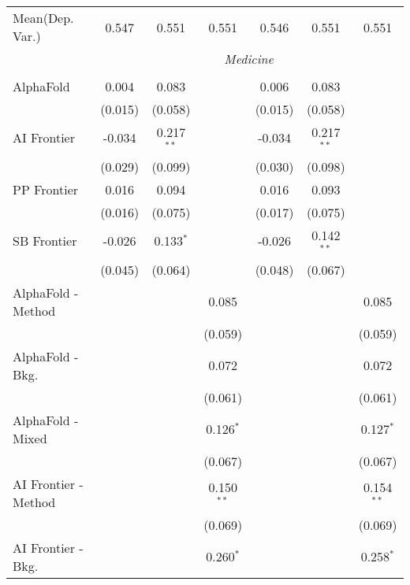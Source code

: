 \begin{tabular}{lcccccc}
Mean(Dep. Var.) & 0.547 & 0.551 & 0.551 & 0.546 & 0.551 & 0.551 \\
 & \multicolumn{6}{c}{\textit{Medicine}} \\ \\
   AlphaFold            & 0.004   & 0.083        &              & 0.006   & 0.083        &   \\   
                        & (0.015) & (0.058)      &              & (0.015) & (0.058)      &   \\   
   AI Frontier          & -0.034  & 0.217$^{**}$ &              & -0.034  & 0.217$^{**}$ &   \\   
                        & (0.029) & (0.099)      &              & (0.030) & (0.098)      &   \\   
   PP Frontier          & 0.016   & 0.094        &              & 0.016   & 0.093        &   \\   
                        & (0.016) & (0.075)      &              & (0.017) & (0.075)      &   \\   
   SB Frontier          & -0.026  & 0.133$^{*}$  &              & -0.026  & 0.142$^{**}$ &   \\   
                        & (0.045) & (0.064)      &              & (0.048) & (0.067)      &   \\   
   AlphaFold - Method   &         &              & 0.085        &         &              & 0.085\\   
                        &         &              & (0.059)      &         &              & (0.059)\\   
   AlphaFold - Bkg.     &         &              & 0.072        &         &              & 0.072\\   
                        &         &              & (0.061)      &         &              & (0.061)\\   
   AlphaFold - Mixed    &         &              & 0.126$^{*}$  &         &              & 0.127$^{*}$\\   
                        &         &              & (0.067)      &         &              & (0.067)\\   
   AI Frontier - Method &         &              & 0.150$^{**}$ &         &              & 0.154$^{**}$\\   
                        &         &              & (0.069)      &         &              & (0.069)\\   
   AI Frontier - Bkg.   &         &              & 0.260$^{*}$  &         &              & 0.258$^{*}$\\   

\end{tabular}

